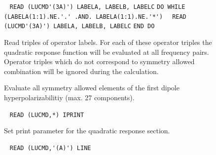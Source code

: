 \begin{description}
\item[] \verb| |\newline
\verb|READ (LUCMD'(3A)') LABELA, LABELB, LABELC|\newline
\verb|DO WHILE (LABELA(1:1).NE.'.' .AND. LABELA(1:1).NE.'*')|\newline
\verb|  READ (LUCMD'(3A)') LABELA, LABELB, LABELC|\newline
\verb|END DO|

Read triples of operator labels. 
For each of these operator triples the quadratic response
function will be evaluated at all frequency pairs.
Operator triples which do not correspond to symmetry allowed
combination will be ignored during the calculation.
 
\item[] 
Evaluate all symmetry allowed elements of the first
dipole hyperpolarizabilitiy (max. 27 components).
 
\item[] \verb| |\newline
     \verb|READ (LUCMD,*) IPRINT|

     Set print parameter for the quadratic response section.
 
 
\item[] \verb| |\newline
   \verb|READ (LUCMD,'(A)') LINE|


\end{description}
